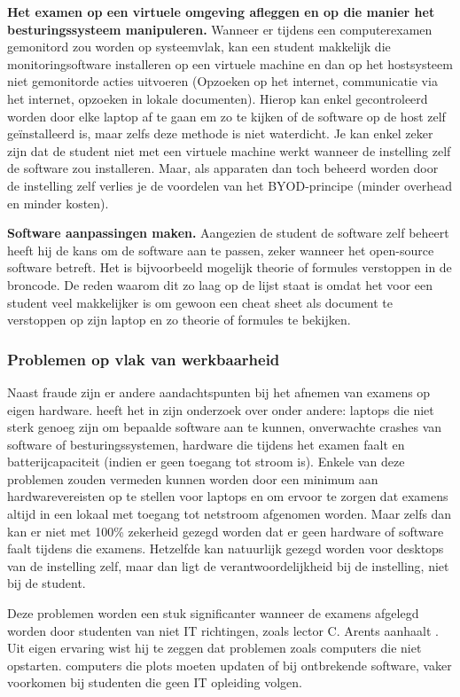 \textbf{Het examen op een virtuele omgeving afleggen en op die manier het besturingssysteem manipuleren.} Wanneer er tijdens een computerexamen gemonitord zou worden op systeemvlak, kan een student makkelijk die monitoringsoftware installeren op een virtuele machine en dan op het hostsysteem niet gemonitorde acties uitvoeren (Opzoeken op het internet, communicatie via het internet, opzoeken in lokale documenten). Hierop kan enkel gecontroleerd worden door elke laptop af te gaan em zo te kijken of de software op de host zelf ge\"{i}nstalleerd is, maar zelfs deze methode is niet waterdicht. Je kan enkel zeker zijn dat de student niet met een virtuele machine werkt wanneer de instelling zelf de software zou installeren. Maar, als apparaten dan toch beheerd worden door de instelling zelf verlies je de voordelen van het BYOD-principe (minder overhead en minder kosten).

\textbf{Software aanpassingen maken.} Aangezien de student de software zelf beheert heeft hij de kans om de software aan te passen, zeker wanneer het open-source software betreft. Het is bijvoorbeeld mogelijk theorie of formules verstoppen in de broncode. De reden waarom dit zo laag op de lijst staat is omdat het voor een student veel makkelijker is om gewoon een cheat sheet als document te verstoppen op zijn laptop en zo theorie of formules te bekijken. 

\subsubsection{Problemen op vlak van werkbaarheid}
Naast fraude zijn er andere aandachtspunten bij het afnemen van examens op eigen hardware. \textcite{Hillier2015} heeft het in zijn onderzoek over onder andere: laptops die niet sterk genoeg zijn om bepaalde software aan te kunnen, onverwachte crashes van software of besturingssystemen, hardware die tijdens het examen faalt en batterijcapaciteit (indien er geen toegang tot stroom is). Enkele van deze problemen zouden vermeden kunnen worden door een minimum aan hardwarevereisten op te stellen voor laptops en om ervoor te zorgen dat examens altijd in een lokaal met toegang tot netstroom afgenomen worden. Maar zelfs dan kan er niet met 100\% zekerheid gezegd worden dat er geen hardware of software faalt tijdens die examens. Hetzelfde kan natuurlijk gezegd worden voor desktops van de instelling zelf, maar dan ligt de verantwoordelijkheid bij de instelling, niet bij de student. 

Deze problemen worden een stuk significanter wanneer de examens afgelegd worden door studenten van niet IT richtingen, zoals lector C. Arents aanhaalt \autocite{Arents2019}. Uit eigen ervaring wist hij te zeggen dat problemen zoals computers die niet opstarten. computers die plots moeten updaten of bij ontbrekende software,  vaker voorkomen bij studenten die geen IT opleiding volgen. 


